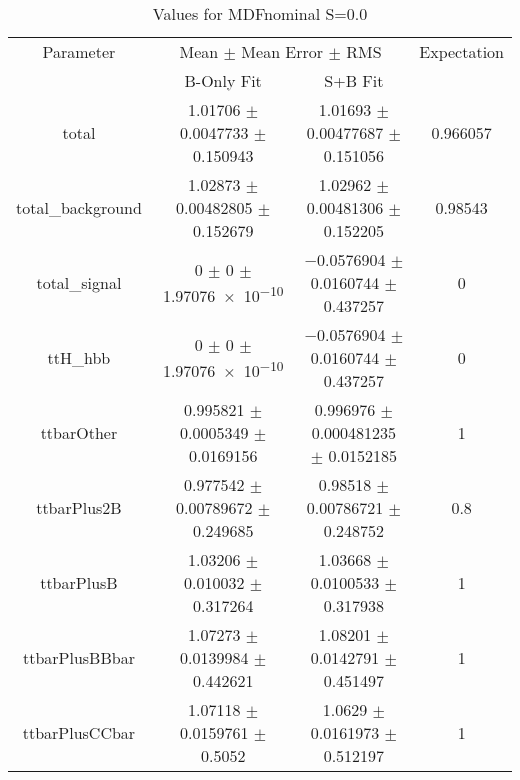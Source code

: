 \begin{table}
\centering
\caption{Values for MDFnominal S=0.0}
\begin{tabular}{cccc}
\toprule
Parameter & \multicolumn{2}{c}{Mean $\pm$ Mean Error $\pm$ RMS} & Expectation\\
 & B-Only Fit & S+B Fit & \\
\midrule
total & \num{1.01706} $\pm$ \num{0.0047733} $\pm$ \num{0.150943} & \num{1.01693} $\pm$ \num{0.00477687} $\pm$ \num{0.151056} & \num{0.966057}\\
total\_background & \num{1.02873} $\pm$ \num{0.00482805} $\pm$ \num{0.152679} & \num{1.02962} $\pm$ \num{0.00481306} $\pm$ \num{0.152205} & \num{0.98543}\\
total\_signal & \num{0} $\pm$ \num{0} $\pm$ \num{1.97076e-10} & \num{-0.0576904} $\pm$ \num{0.0160744} $\pm$ \num{0.437257} & \num{0}\\
ttH\_hbb & \num{0} $\pm$ \num{0} $\pm$ \num{1.97076e-10} & \num{-0.0576904} $\pm$ \num{0.0160744} $\pm$ \num{0.437257} & \num{0}\\
ttbarOther & \num{0.995821} $\pm$ \num{0.0005349} $\pm$ \num{0.0169156} & \num{0.996976} $\pm$ \num{0.000481235} $\pm$ \num{0.0152185} & \num{1}\\
ttbarPlus2B & \num{0.977542} $\pm$ \num{0.00789672} $\pm$ \num{0.249685} & \num{0.98518} $\pm$ \num{0.00786721} $\pm$ \num{0.248752} & \num{0.8}\\
ttbarPlusB & \num{1.03206} $\pm$ \num{0.010032} $\pm$ \num{0.317264} & \num{1.03668} $\pm$ \num{0.0100533} $\pm$ \num{0.317938} & \num{1}\\
ttbarPlusBBbar & \num{1.07273} $\pm$ \num{0.0139984} $\pm$ \num{0.442621} & \num{1.08201} $\pm$ \num{0.0142791} $\pm$ \num{0.451497} & \num{1}\\
ttbarPlusCCbar & \num{1.07118} $\pm$ \num{0.0159761} $\pm$ \num{0.5052} & \num{1.0629} $\pm$ \num{0.0161973} $\pm$ \num{0.512197} & \num{1}\\
\bottomrule
\end{tabular}
\end{table}